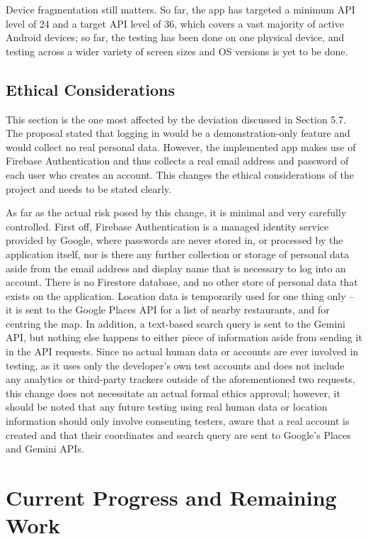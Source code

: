 \documentclass[12pt, a4paper]{article}
\begin{document}
Device fragmentation still matters. So far, the app has targeted a minimum API level of 24 and a target API level of 36, which covers a vast majority of active Android devices; so far, the testing has been done on one physical device, and testing across a wider variety of screen sizes and OS versions is yet to be done.

\subsection{Ethical Considerations}

This section is the one most affected by the deviation discussed in Section 5.7. The proposal stated that logging in would be a demonstration-only feature and would collect no real personal data. However, the implemented app makes use of Firebase Authentication and thus collects a real email address and password of each user who creates an account. This changes the ethical considerations of the project and needs to be stated clearly.

As far as the actual risk posed by this change, it is minimal and very carefully controlled. First off, Firebase Authentication is a managed identity service provided by Google, where passwords are never stored in, or processed by the application itself, nor is there any further collection or storage of personal data aside from the email address and display name that is necessary to log into an account. There is no Firestore database, and no other store of personal data that exists on the application. Location data is temporarily used for one thing only -- it is sent to the Google Places API for a list of nearby restaurants, and for centring the map. In addition, a text-based search query is sent to the Gemini API, but nothing else happens to either piece of information aside from sending it in the API requests. Since no actual human data or accounts are ever involved in testing, as it uses only the developer's own test accounts and does not include any analytics or third-party trackers outside of the aforementioned two requests, this change does not necessitate an actual formal ethics approval; however, it should be noted that any future testing using real human data or location information should only involve consenting testers, aware that a real account is created and that their coordinates and search query are sent to Google's Places and Gemini APIs.

\section{Current Progress and Remaining Work}
\end{document}
